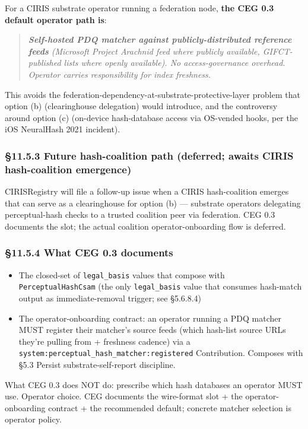 \documentclass[11pt]{article}
\begin{document}
For a CIRIS substrate operator running a federation node, \textbf{the CEG 0.3 default operator path is}:


\begin{quote}\itshape \textbf{Self-hosted PDQ matcher against publicly-distributed reference feeds} (Microsoft Project Arachnid feed where publicly available, GIFCT-published lists where openly available). No access-governance overhead. Operator carries responsibility for index freshness.\end{quote}


This avoids the federation-dependency-at-substrate-protective-layer problem that option (b) (clearinghouse delegation) would introduce, and the controversy around option (c) (on-device hash-database access via OS-vended hooks, per the iOS NeuralHash 2021 incident).


\subsubsection*{§11.5.3 Future hash-coalition path (deferred; awaits CIRIS hash-coalition emergence)}


CIRISRegistry will file a follow-up issue when a CIRIS hash-coalition emerges that can serve as a clearinghouse for option (b) — substrate operators delegating perceptual-hash checks to a trusted coalition peer via federation. CEG 0.3 documents the slot; the actual coalition operator-onboarding flow is deferred.


\subsubsection*{§11.5.4 What CEG 0.3 documents}


\begin{itemize}\setlength\itemsep{0pt}
\item The closed-set of \texttt{legal\_basis} values that compose with \texttt{PerceptualHashCsam} (the only \texttt{legal\_basis} value that consumes hash-match output as immediate-removal trigger; see §5.6.8.4)
\item The operator-onboarding contract: an operator running a PDQ matcher MUST register their matcher's source feeds (which hash-list source URLs they're pulling from + freshness cadence) via a \texttt{system:perceptual\_hash\_matcher:registered} Contribution. Composes with §5.3 Persist substrate-self-report discipline.
\end{itemize}


What CEG 0.3 does NOT do: prescribe which hash databases an operator MUST use. Operator choice. CEG documents the wire-format slot + the operator-onboarding contract + the recommended default; concrete matcher selection is operator policy.
\end{document}
